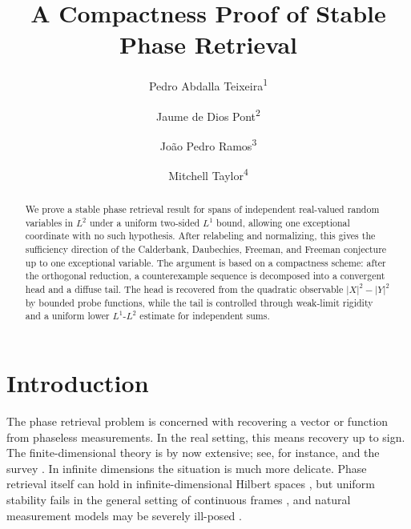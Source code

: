 \documentclass[11pt]{amsart}
\title{A Compactness Proof of Stable Phase Retrieval}
\author{Pedro Abdalla Teixeira\textsuperscript{1}}
\author{Jaume de Dios Pont\textsuperscript{2}}
\author{Jo\~ao Pedro Ramos\textsuperscript{3}}
\author{Mitchell Taylor\textsuperscript{4}}
\begin{document}
\begin{abstract}
We prove a stable phase retrieval result for spans of independent real-valued
random variables in $L^2$ under a uniform two-sided $L^1$ bound, allowing one
exceptional coordinate with no such hypothesis. After relabeling and
normalizing, this gives the sufficiency direction of the Calderbank,
Daubechies, Freeman, and Freeman conjecture up to one exceptional variable. The
argument is based on a compactness scheme: after the orthogonal reduction, a
counterexample sequence is decomposed into a convergent head and a
diffuse tail. The head is recovered from the quadratic observable
$|X|^2-|Y|^2$ by bounded probe functions, while the tail is controlled through
weak-limit rigidity and a uniform lower $L^1$-$L^2$ estimate for independent
sums.
\end{abstract}
\maketitle
{}
\begingroup
\renewcommand{\thefootnote}{\arabic{footnote}}
\endgroup
\setcounter{footnote}{0}

\section{Introduction}

The phase retrieval problem is concerned with recovering a vector or function
from phaseless measurements. In the real setting, this means recovery up to
sign. The finite-dimensional theory is by now extensive; see, for instance,
\cite{bandeira2014saving,eldar2014stability} and the survey
\cite{grohs2020survey}. In infinite dimensions the situation is much more
delicate. Phase retrieval itself can hold in infinite-dimensional Hilbert
spaces \cite{cahill2016infinite}, but uniform stability fails in the general
setting of continuous frames \cite{alaifari2017continuous}, and natural
measurement models may be severely ill-posed \cite{alaifari2021gabor}.
\end{document}
